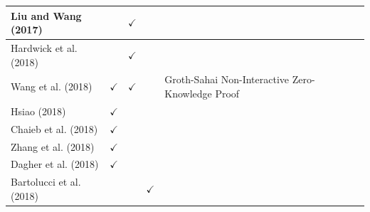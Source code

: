 \documentclass[../access.tex]{subfiles}
\begin{document}
\begin{table}[htbp]
\begin{adjustwidth}{-2cm}{}
\begin{tabular}{m{4.4cm} c >{\centering\arraybackslash}m{1.7cm} c >{\centering\arraybackslash}m{6cm} >{\centering\arraybackslash} m{1.0cm} >{\centering\arraybackslash}m{14.9cm}}
            \hline
            \footnotesize{Liu and Wang (2017) \cite{Liu2017}}              & {}                                                   & $ \checkmark $                       & {}                      & {}                                                                                       \\
            \hline
            \footnotesize{Hardwick et al. (2018) \cite{Hardwick2018}}      & {}                                                   & $ \checkmark $                       & {}                      & {}                                                                                       \\
            \hline
            \footnotesize{Wang et al. (2018) \cite{Wang2018}}              & $ \checkmark $                                       & $ \checkmark $                       & {}                      & \footnotesize{Groth-Sahai Non-Interactive Zero-Knowledge Proof}                          \\
            \hline
            \footnotesize{Hsiao (2018) \cite{Hsiao2018}}                   & $ \checkmark $                                       & {}                                   & {}                      & {}                                                                                       \\
            \hline
            \footnotesize{Chaieb et al. (2018) \cite{Chaieb2018}}          & $ \checkmark $                                       & {}                                   & {}                      & {}                                                                                       \\
            \hline
            \footnotesize{Zhang et al. (2018) \cite{Zhang2018}}            & $ \checkmark $                                       & {}                                   & {}                      & {}                                                                                       \\
            \hline
            \footnotesize{Dagher et al. (2018) \cite{Dagher2018}}          & $ \checkmark $                                       & {}                                   & {}                      & {}                                                                                       \\
            \hline
            \footnotesize{Bartolucci et al. (2018) \cite{Bartolucci2018}}  & {}                                                   & {}                                   & $ \checkmark $          & {}                                                                                       \\

\end{tabular}
\end{adjustwidth}
\end{table}
\end{document}
